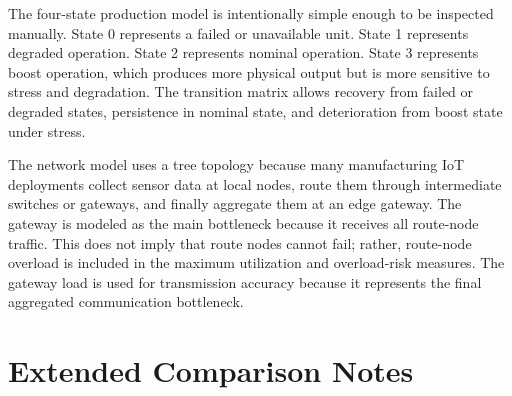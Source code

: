 \documentclass[journal]{IEEEtran}
\begin{document}
The four-state production model is intentionally simple enough to be inspected manually. State 0 represents a failed or unavailable unit. State 1 represents degraded operation. State 2 represents nominal operation. State 3 represents boost operation, which produces more physical output but is more sensitive to stress and degradation. The transition matrix allows recovery from failed or degraded states, persistence in nominal state, and deterioration from boost state under stress.

The network model uses a tree topology because many manufacturing IoT deployments collect sensor data at local nodes, route them through intermediate switches or gateways, and finally aggregate them at an edge gateway. The gateway is modeled as the main bottleneck because it receives all route-node traffic. This does not imply that route nodes cannot fail; rather, route-node overload is included in the maximum utilization and overload-risk measures. The gateway load is used for transmission accuracy because it represents the final aggregated communication bottleneck.

\begin{table}[H]
\centering
\caption{Interpretation of major model variables.}
\label{tab:variables}
\end{table}

\section{Extended Comparison Notes}
\end{document}
